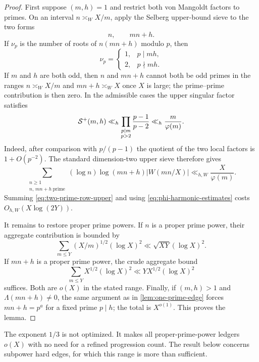 \begin{proof}
First suppose $(m,h)=1$ and restrict both von Mangoldt factors to primes.
On an interval $n\asymp_W X/m$, apply the Selberg upper-bound sieve to the
two forms
\[
 n,\qquad mn+h.
\]
If $\nu_p$ is the number of roots of $n(mn+h)$ modulo $p$, then
\[
 \nu_p=
 \begin{cases}
  1,&p\mid mh,\\
  2,&p\nmid mh.
 \end{cases}
\]
If $m$ and $h$ are both odd, then $n$ and $mn+h$ cannot both be odd primes
in the ranges $n\asymp_W X/m$ and $mn+h\asymp_W X$ once $X$ is large; the
prime--prime contribution is then zero.  In the admissible cases the upper
singular factor satisfies
\begin{equation}\label{eq:upper-singular-factor}
 \mathcal S^+(m,h)
 \ll_h\prod_{\substack{p\mid m\\p>2}}\frac{p-1}{p-2}
 \ll_h\frac{m}{\varphi(m)}.
\end{equation}
Indeed, after comparison with $p/(p-1)$ the quotient of the two local
factors is $1+O(p^{-2})$.  The standard dimension-two upper sieve
\citep[Chapter~6]{IwaniecKowalski2004} therefore gives
\begin{equation}\label{eq:two-prime-row-upper}
 \sum_{\substack{n\geq1\\n,\,mn+h\ \mathrm{prime}}}
 (\log n)\log(mn+h)|W(mn/X)|
 \ll_{h,W}\frac{X}{\varphi(m)}.
\end{equation}
Summing \eqref{eq:two-prime-row-upper} and using
\eqref{eq:phi-harmonic-estimates} costs $O_{h,W}(X\log(2Y))$.

It remains to restore proper prime powers.  If $n$ is a proper prime
power, their aggregate contribution is bounded by
\[
 \sum_{m\leq Y}(X/m)^{1/2}(\log X)^2
 \ll \sqrt{XY}(\log X)^2.
\]
If $mn+h$ is a proper prime power, the crude aggregate bound
\[
 \sum_{m\leq Y}X^{1/2}(\log X)^2
 \ll YX^{1/2}(\log X)^2
\]
suffices.  Both are $o(X)$ in the stated range.  Finally, if $(m,h)>1$
and $\Lambda(mn+h)\ne0$, the same argument as in
\cref{lem:one-prime-edge} forces $mn+h=p^a$ for a fixed prime $p\mid h$;
the total is $X^{o(1)}$.  This proves the lemma.
\end{proof}

\begin{remark}
The exponent $1/3$ is not optimized.  It makes all proper-prime-power
ledgers $o(X)$ with no need for a refined progression count.  The result
below concerns subpower hard edges, for which this range is more than
sufficient.
\end{remark}

